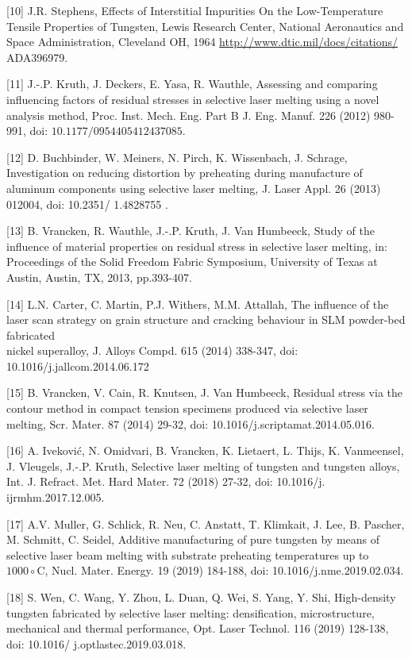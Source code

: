 \documentclass[10pt]{article}
\begin{document}
[10] J.R. Stephens, Effects of Interstitial Impurities On the Low-Temperature Tensile Properties of Tungsten, Lewis Research Center, National Aeronautics and Space Administration, Cleveland OH, 1964 \href{http://www.dtic.mil/docs/citations/}{http://www.dtic.mil/docs/citations/} ADA396979.

[11] J.-.P. Kruth, J. Deckers, E. Yasa, R. Wauthle, Assessing and comparing influencing factors of residual stresses in selective laser melting using a novel analysis method, Proc. Inst. Mech. Eng. Part B J. Eng. Manuf. 226 (2012) 980-991, doi: $10.1177 / 0954405412437085$.

[12] D. Buchbinder, W. Meiners, N. Pirch, K. Wissenbach, J. Schrage, Investigation on reducing distortion by preheating during manufacture of aluminum components using selective laser melting, J. Laser Appl. 26 (2013) 012004, doi: 10.2351/ 1.4828755 .

[13] B. Vrancken, R. Wauthle, J.-.P. Kruth, J. Van Humbeeck, Study of the influence of material properties on residual stress in selective laser melting, in: Proceedings of the Solid Freedom Fabric Symposium, University of Texas at Austin, Austin, TX, 2013, pp.393-407.

[14] L.N. Carter, C. Martin, P.J. Withers, M.M. Attallah, The influence of the laser scan strategy on grain structure and cracking behaviour in SLM powder-bed fabricated\\
nickel superalloy, J. Alloys Compd. 615 (2014) 338-347, doi: 10.1016/j.jallcom.2014.06.172

[15] B. Vrancken, V. Cain, R. Knutsen, J. Van Humbeeck, Residual stress via the contour method in compact tension specimens produced via selective laser melting, Scr. Mater. 87 (2014) 29-32, doi: 10.1016/j.scriptamat.2014.05.016.

[16] A. Iveković, N. Omidvari, B. Vrancken, K. Lietaert, L. Thijs, K. Vanmeensel, J. Vleugels, J.-.P. Kruth, Selective laser melting of tungsten and tungsten alloys, Int. J. Refract. Met. Hard Mater. 72 (2018) 27-32, doi: 10.1016/j. ijrmhm.2017.12.005.

[17] A.V. Muller, G. Schlick, R. Neu, C. Anstatt, T. Klimkait, J. Lee, B. Pascher, M. Schmitt, C. Seidel, Additive manufacturing of pure tungsten by means of selective laser beam melting with substrate preheating temperatures up to $1000 \circ \mathrm{C}$, Nucl. Mater. Energy. 19 (2019) 184-188, doi: 10.1016/j.nme.2019.02.034.

[18] S. Wen, C. Wang, Y. Zhou, L. Duan, Q. Wei, S. Yang, Y. Shi, High-density tungsten fabricated by selective laser melting: densification, microstructure, mechanical and thermal performance, Opt. Laser Technol. 116 (2019) 128-138, doi: 10.1016/ j.optlastec.2019.03.018.
\end{document}
